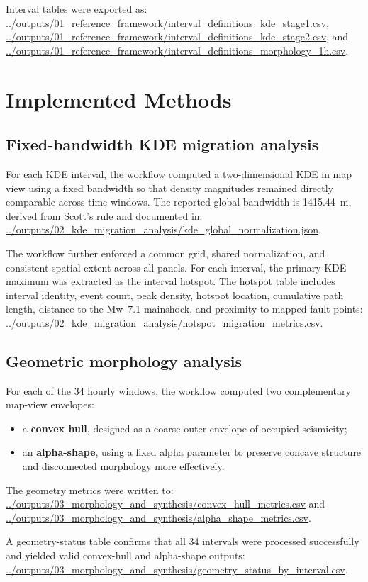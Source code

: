 \documentclass[11pt]{article}
\begin{document}
Interval tables were exported as:
\url{../outputs/01_reference_framework/interval_definitions_kde_stage1.csv},
\url{../outputs/01_reference_framework/interval_definitions_kde_stage2.csv}, and
\url{../outputs/01_reference_framework/interval_definitions_morphology_1h.csv}.

\section{Implemented Methods}
\subsection{Fixed-bandwidth KDE migration analysis}
For each KDE interval, the workflow computed a two-dimensional KDE in map view using a fixed bandwidth so that density magnitudes remained directly comparable across time windows. The reported global bandwidth is 1415.44~m, derived from Scott's rule and documented in:
\url{../outputs/02_kde_migration_analysis/kde_global_normalization.json}.

The workflow further enforced a common grid, shared normalization, and consistent spatial extent across all panels. For each interval, the primary KDE maximum was extracted as the interval hotspot. The hotspot table includes interval identity, event count, peak density, hotspot location, cumulative path length, distance to the Mw~7.1 mainshock, and proximity to mapped fault points:
\url{../outputs/02_kde_migration_analysis/hotspot_migration_metrics.csv}.

\subsection{Geometric morphology analysis}
For each of the 34 hourly windows, the workflow computed two complementary map-view envelopes:
\begin{itemize}[leftmargin=*]
    \item a \textbf{convex hull}, designed as a coarse outer envelope of occupied seismicity;
    \item an \textbf{alpha-shape}, using a fixed alpha parameter to preserve concave structure and disconnected morphology more effectively.
\end{itemize}

The geometry metrics were written to:
\url{../outputs/03_morphology_and_synthesis/convex_hull_metrics.csv} and
\url{../outputs/03_morphology_and_synthesis/alpha_shape_metrics.csv}.

A geometry-status table confirms that all 34 intervals were processed successfully and yielded valid convex-hull and alpha-shape outputs:
\url{../outputs/03_morphology_and_synthesis/geometry_status_by_interval.csv}.
\end{document}
